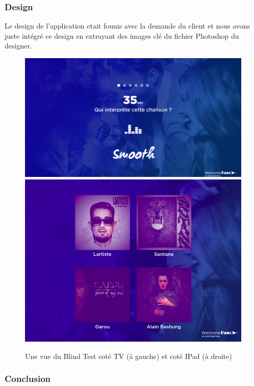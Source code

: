 \documentclass{article}
\begin{document}

\subsubsection{Design}

Le design de l'application etait founis avec la demande du client et nous avons juste intégré ce design en extrayant des images clé du fichier Photoshop du designer.

\begin{figure}[h]
    \centering
    \includegraphics[scale=0.12]{blind-test-tv.png}
    \includegraphics[scale=0.22]{blind-test-ipad.png}
    \caption{Une vue du Blind Test coté TV (à gauche) et coté IPad (à droite)}
\end{figure}

\subsubsection{Conclusion}
\end{document}
